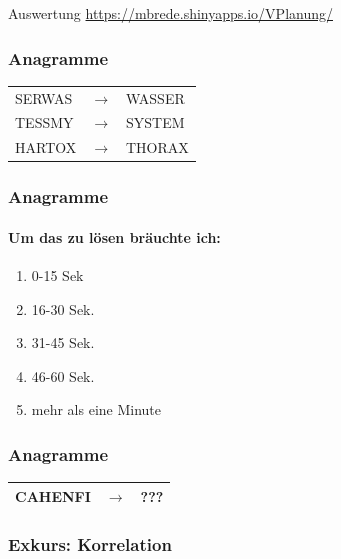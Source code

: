 \documentclass[
]{book}
\providecommand{\tightlist}{%
  \setlength{\itemsep}{0pt}\setlength{\parskip}{0pt}}
\begin{document}
Auswertung \href{hier}{https://mbrede.shinyapps.io/VPlanung/}

\hypertarget{anagramme}{%
\subsubsection{Anagramme}\label{anagramme}}

\begin{longtable}[]{@{}lll@{}}
\toprule
\endhead
SERWAS & \(\rightarrow\) & WASSER\tabularnewline
TESSMY & \(\rightarrow\) & SYSTEM\tabularnewline
HARTOX & \(\rightarrow\) & THORAX\tabularnewline
\bottomrule
\end{longtable}

\hypertarget{anagramme-1}{%
\subsubsection{Anagramme}\label{anagramme-1}}

\hypertarget{um-das-zu-luxf6sen-bruxe4uchte-ich}{%
\paragraph{Um das zu lösen bräuchte ich:}\label{um-das-zu-luxf6sen-bruxe4uchte-ich}}

\begin{enumerate}
\def\labelenumi{\Alph{enumi})}
\tightlist
\item
  0-15 Sek
\item
  16-30 Sek.
\item
  31-45 Sek.
\item
  46-60 Sek.
\item
  mehr als eine Minute
\end{enumerate}

\hypertarget{anagramme-2}{%
\subsubsection{Anagramme}\label{anagramme-2}}

\begin{longtable}[]{@{}lll@{}}
\toprule
\endhead
CAHENFI & \(\rightarrow\) & ???\tabularnewline
\bottomrule
\end{longtable}

\hypertarget{exkurs-korrelation}{%
\subsubsection{Exkurs: Korrelation}\label{exkurs-korrelation}}
\end{document}
